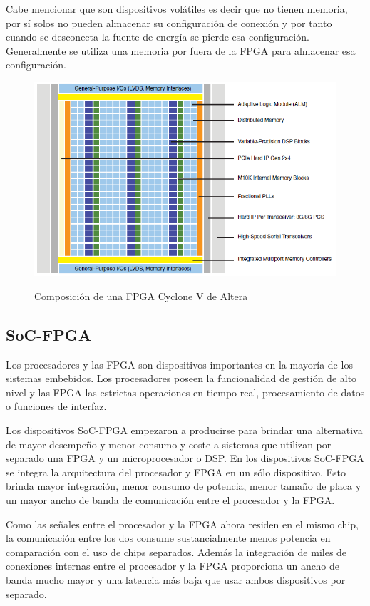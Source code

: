 Cabe mencionar que son dispositivos volátiles es decir que no tienen memoria, por sí solos no pueden almacenar su configuración de conexión y por tanto cuando se desconecta la fuente de energía se pierde esa configuración. Generalmente se utiliza una memoria por fuera de la FPGA para almacenar esa configuración.


\begin{figure}
\centering
\includegraphics[scale=0.5]{./Figures/22-0.png}
\label{fpga_por_dentro}
\caption{Composición de una FPGA Cyclone V de Altera}
\end{figure}


\subsection{SoC-FPGA}

Los procesadores y las FPGA son dispositivos importantes en la mayoría de los sistemas embebidos. Los procesadores poseen la funcionalidad de gestión de alto nivel y las FPGA las estrictas operaciones en tiempo real, procesamiento de datos o funciones de interfaz.

Los dispositivos SoC-FPGA empezaron a producirse para brindar una alternativa de mayor desempeño y menor consumo y coste a sistemas que utilizan por separado una FPGA y un microprocesador o DSP. En los dispositivos SoC-FPGA se integra la arquitectura del procesador y FPGA en un sólo dispositivo. Esto brinda mayor integración, menor consumo de potencia, menor tamaño de placa y un mayor ancho de banda de comunicación entre el procesador y la FPGA.

Como las señales entre el procesador y la FPGA ahora residen en el mismo chip, la comunicación entre los dos consume
sustancialmente menos potencia en comparación con el uso de chips separados. Además la integración de miles de conexiones internas entre el procesador y la FPGA proporciona un ancho de banda mucho mayor y una latencia más baja que usar ambos dispositivos por separado.

